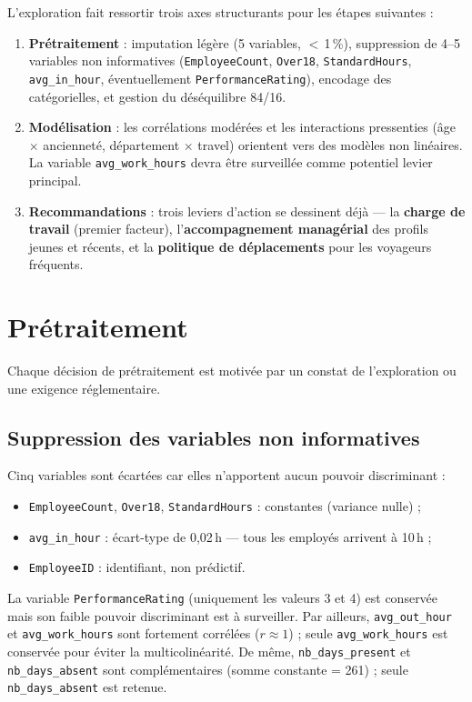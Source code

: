 L'exploration fait ressortir trois axes structurants pour les étapes suivantes :
\begin{enumerate}
    \item \textbf{Prétraitement} : imputation légère (5 variables, $<$\,1\,\%), suppression de 4--5 variables non informatives (\texttt{EmployeeCount}, \texttt{Over18}, \texttt{StandardHours}, \texttt{avg\_in\_hour}, éventuellement \texttt{PerformanceRating}), encodage des catégorielles, et gestion du déséquilibre 84/16.
    \item \textbf{Modélisation} : les corrélations modérées et les interactions pressenties (âge $\times$ ancienneté, département $\times$ travel) orientent vers des modèles non linéaires. La variable \texttt{avg\_work\_hours} devra être surveillée comme potentiel levier principal.
    \item \textbf{Recommandations} : trois leviers d'action se dessinent déjà --- la \textbf{charge de travail} (premier facteur), l'\textbf{accompagnement managérial} des profils jeunes et récents, et la \textbf{politique de déplacements} pour les voyageurs fréquents.
\end{enumerate}

\section{Prétraitement}

Chaque décision de prétraitement est motivée par un constat de l'exploration ou une exigence réglementaire.

\subsection{Suppression des variables non informatives}

Cinq variables sont écartées car elles n'apportent aucun pouvoir discriminant :
\begin{itemize}
    \item \texttt{EmployeeCount}, \texttt{Over18}, \texttt{StandardHours} : constantes (variance nulle) ;
    \item \texttt{avg\_in\_hour} : écart-type de 0,02\,h --- tous les employés arrivent à 10\,h ;
    \item \texttt{EmployeeID} : identifiant, non prédictif.
\end{itemize}
La variable \texttt{PerformanceRating} (uniquement les valeurs 3 et 4) est conservée mais son faible pouvoir discriminant est à surveiller. Par ailleurs, \texttt{avg\_out\_hour} et \texttt{avg\_work\_hours} sont fortement corrélées ($r \approx 1$) ; seule \texttt{avg\_work\_hours} est conservée pour éviter la multicolinéarité. De même, \texttt{nb\_days\_present} et \texttt{nb\_days\_absent} sont complémentaires (somme constante = 261) ; seule \texttt{nb\_days\_absent} est retenue.

